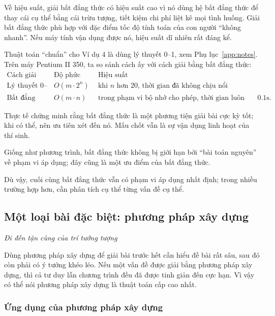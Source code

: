 \documentclass[11pt]{article}
\begin{document}
Về hiệu suất, giải bất đẳng thức có hiệu suất cao vì nó dùng hệ bất đẳng thức
để thay cái cụ thể bằng cái trừu tượng, tiết kiệm chi phí liệt kê mọi tình
huống. Giải bất đẳng thức phù hợp với đặc điểm tốc độ tính toán của con người
``không nhanh''. Nếu máy tính vận dụng được nó, hiệu suất dĩ nhiên rất đáng
kể.

Thuật toán ``chuẩn'' cho Ví dụ 4 là dùng lý thuyết 0--1, xem
Phụ lục~\ref{app:notes}. Trên máy Pentium II 350, ta so sánh cách ấy với cách
giải bằng bất đẳng thức:
\[
\begin{array}{c|c|l}
\text{Cách giải} & \text{Độ phức tạp} & \text{Hiệu suất}\\
\hline
\text{Lý thuyết 0--1} & O(m\cdot 2^n) &
\text{khi }n\text{ hơn 20, thời gian đã không chịu nổi}\\
\text{Bất đẳng thức} & O(m\cdot n) &
\text{trong phạm vi bộ nhớ cho phép, thời gian luôn dưới }0.1\text{s}.
\end{array}
\]

Thực tế chứng minh rằng bất đẳng thức là một phương tiện giải bài cực kỳ tốt;
khi có thể, nên ưu tiên xét đến nó. Mấu chốt vẫn là sự vận dụng linh hoạt của
thí sinh.

Giống như phương trình, bất đẳng thức không bị giới hạn bởi ``bài toán
nguyên'' về phạm vi áp dụng; đây cũng là một ưu điểm của bất đẳng thức.

Dù vậy, cuối cùng bất đẳng thức vẫn có phạm vi áp dụng nhất định; trong nhiều
trường hợp hơn, cần phân tích cụ thể từng vấn đề cụ thể.

\subsection{Một loại bài đặc biệt: phương pháp xây dựng}

\begin{center}
\textit{Đi đến tận cùng của trí tưởng tượng}
\end{center}

Dùng phương pháp xây dựng để giải bài trước hết cần hiểu đề bài rất sâu, sau
đó còn phải có ý tưởng khéo léo. Nếu một vấn đề được giải bằng phương pháp
xây dựng, thì cả tư duy lẫn chương trình đều đã được tinh giản đến cực hạn.
Vì vậy có thể nói phương pháp xây dựng là thuật toán cấp cao nhất.

\subsubsection{Ứng dụng của phương pháp xây dựng}
\end{document}
